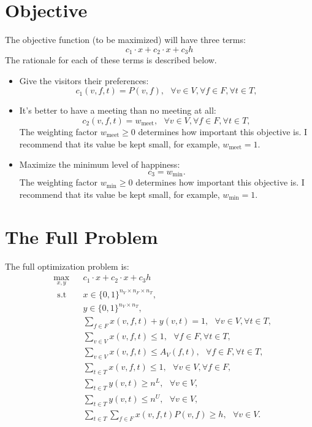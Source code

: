 \documentclass[12pt]{article}
\theoremstyle{definition}
\newtheorem{definition set}{Definition Set}%
\newtheorem{problem statement}{Problem Statement} %
\theoremstyle{remark}
\theoremstyle{remark}
\begin{document}
\section{Objective}
The objective function (to be maximized) will have three terms:
\begin{equation}
c_1 \cdot x + c_2 \cdot x + c_3 h
\end{equation}
The rationale for each of these terms is described below.
\begin{itemize}
\item
Give the visitors their preferences:
\begin{equation}
c_1(v,f,t) = P(v,f), \ \ \ \forall v \in V, \forall f \in F, \forall t \in T,
\end{equation}

\item
It\rq{}s better to have a meeting than no meeting at all:
\begin{equation}
c_2(v,f,t) = w_{\text{meet}}, \ \ \ \forall v \in V, \forall f \in F, \forall t \in T,
\end{equation}
The weighting factor $w_{\text{meet}} \geq 0$ determines how important this objective is.
I recommend that its value be kept small, for example, $w_{\text{meet}} = 1$.

\item
Maximize the minimum level of happiness:
\begin{equation}
c_3 = w_{\text{min}}.
\end{equation}
The weighting factor $w_{\text{min}} \geq 0$ determines how important this objective is.
I recommend that its value be kept small, for example, $w_{\text{min}} = 1$.
\end{itemize}


\section{The Full Problem}
The full optimization problem is:
\begin{equation}
\begin{aligned}
&\max_{x,y} && c_1 \cdot x + c_2 \cdot x + c_3 h\\
&\ \ \text{s.t} && x \in \{0,1\}^{n_V \times n_F \times n_T}, \\
& && y \in \{0,1\}^{n_V \times n_T}, \\
& && \sum_{f \in F} x(v,f,t) + y(v,t) = 1, \ \ \ \forall v \in V, \forall t \in T, \\
& && \sum_{v \in V} x(v,f,t) \leq 1, \ \ \ \forall f \in F, \forall t \in T, \\
& && \sum_{v \in V} x(v,f,t) \leq A_V(f,t), \ \ \ \forall f \in F, \forall t \in T, \\
& && \sum_{t \in T} x(v,f,t) \leq 1, \ \ \ \forall v \in V, \forall f \in F, \\
& && \sum_{t \in T} y(v,t) \geq n^L, \ \ \ \forall v \in V, \\
& && \sum_{t \in T} y(v,t) \leq n^U, \ \ \ \forall v \in V, \\
& && \sum_{t \in T} \sum_{f \in F} x(v,f,t) P(v,f) \geq h, \ \ \ \forall v \in V.
\end{aligned}
\end{equation}
\end{document}
